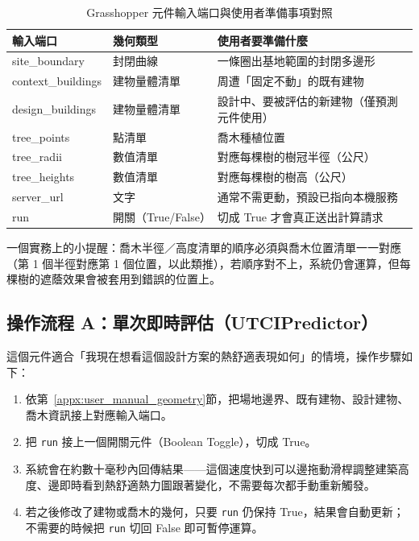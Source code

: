 \begin{table}[htbp]
    \centering
    \caption{Grasshopper 元件輸入端口與使用者準備事項對照}
    \label{tab:gh_inputs}
    \small
    \begin{tabularx}{\textwidth}{llX}
        \toprule
        \textbf{輸入端口} & \textbf{幾何類型} & \textbf{使用者要準備什麼} \\
        \midrule
        site\_boundary     & 封閉曲線     & 一條圈出基地範圍的封閉多邊形 \\
        context\_buildings & 建物量體清單 & 周遭「固定不動」的既有建物 \\
        design\_buildings  & 建物量體清單 & 設計中、要被評估的新建物（僅預測元件使用） \\
        tree\_points       & 點清單       & 喬木種植位置 \\
        tree\_radii        & 數值清單     & 對應每棵樹的樹冠半徑（公尺） \\
        tree\_heights      & 數值清單     & 對應每棵樹的樹高（公尺） \\
        server\_url        & 文字         & 通常不需更動，預設已指向本機服務 \\
        run                & 開關（True/False）& 切成 True 才會真正送出計算請求 \\
        \bottomrule
    \end{tabularx}
\end{table}

一個實務上的小提醒：喬木半徑／高度清單的順序必須與喬木位置清單一一對應（第 1 個半徑對應第 1 個位置，以此類推），若順序對不上，系統仍會運算，但每棵樹的遮蔭效果會被套用到錯誤的位置上。

\subsection{操作流程 A：單次即時評估（UTCIPredictor）}
\label{appx:user_manual_predict}

這個元件適合「我現在想看這個設計方案的熱舒適表現如何」的情境，操作步驟如下：

\begin{enumerate}
    \item 依第~\ref{appx:user_manual_geometry}節，把場地邊界、既有建物、設計建物、喬木資訊接上對應輸入端口。
    \item 把 \texttt{run} 接上一個開關元件（Boolean Toggle），切成 True。
    \item 系統會在約數十毫秒內回傳結果——這個速度快到可以邊拖動滑桿調整建築高度、邊即時看到熱舒適熱力圖跟著變化，不需要每次都手動重新觸發。
    \item 若之後修改了建物或喬木的幾何，只要 \texttt{run} 仍保持 True，結果會自動更新；不需要的時候把 \texttt{run} 切回 False 即可暫停運算。
\end{enumerate}

